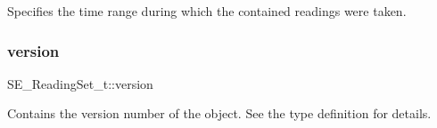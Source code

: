 Specifies the time range during which the contained readings were taken. \mbox{\label{group__ReadingSet_gab59f9eff3274eb6686af1cb1165b18b0}} 
\subsubsection{\texorpdfstring{version}{version}}
{\footnotesize\ttfamily S\+E\+\_\+\+Reading\+Set\+\_\+t\+::version}

Contains the version number of the object. See the type definition for details. 